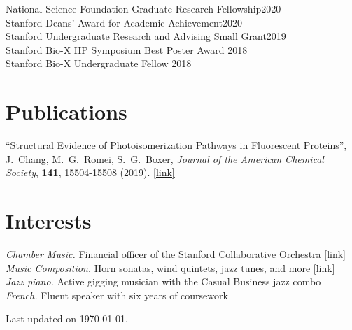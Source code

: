 \documentclass[margin,11pt]{res}
\begin{document}
\begin{resume}
National Science Foundation Graduate Research Fellowship\hfill 2020 \\
Stanford Deans' Award for Academic Achievement\hfill 2020 \\
Stanford Undergraduate Research and Advising Small Grant\hfill 2019 \\
Stanford Bio-X IIP Symposium Best Poster Award \hfill 2018 \\
Stanford Bio-X Undergraduate Fellow \hfill 2018

\section{Publications}

% 

\begin{changemargin}{0em}{3em}
    ``Structural Evidence of Photoisomerization Pathways in Fluorescent Proteins'',
    \underline{J.\ Chang}, M.\ G.\ Romei, S.\ G.\ Boxer,
    \textit{Journal of the American Chemical Society},
    \textbf{141},
    15504-15508
    (2019).
    \href{http://dx.doi.org/10.1021/jacs.9b08356}{[link]}
\end{changemargin}

\section{Interests}

\textit{Chamber Music.} Financial officer of the Stanford Collaborative Orchestra \href{https://scor.stanford.edu}{[link]} \\
\textit{Music Composition.} Horn sonatas, wind quintets, jazz tunes, and more \href{https://stanford.edu/~jeffjar/music.html}{[link]} \\
\textit{Jazz piano.} Active gigging musician with the Casual Business jazz combo \\
\textit{French.} Fluent speaker with six years of coursework

\end{resume}

\vfill\hfill{\scriptsize Last updated on \today.}
\end{document}
